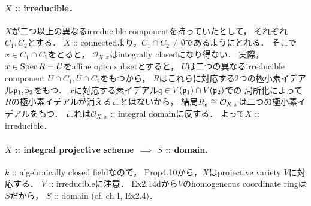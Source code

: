 \documentclass[a4paper]{jsarticle}
\newcommand{\shO}{\mathcal{O}}
\begin{document}
    \paragraph{$X$ :: irreducible．}
    $X$が二つ以上の異なるirreducible componentを持っていたとして，
    それぞれ$C_1, C_2$とする．
    $X$ :: connectedより，$C_1 \cap C_2 \neq \emptyset$であるようにとれる．
    そこで$x \in C_1 \cap C_2$をとると，
    $\shO_{X,x}$はintegrally closedになり得ない．
    実際，
    $x \in \operatorname{Spec} R=U$をaffine open subsetとすると，
    $U$は二つの異なるirreducible component $U \cap C_1, U \cap C_2$をもつから，
    $R$はこれらに対応する2つの極小素イデアル$\mathfrak{p}_1, \mathfrak{p}_2$をもつ．
    $x$に対応する素イデアル$\mathfrak{q} \in V(\mathfrak{p}_1) \cap V(\mathfrak{p}_2)$での
    局所化によって$R$の極小素イデアルが消えることはないから，
    結局$R_{\I{q}} \iso \shO_{X,x}$は二つの極小素イデアルをもつ．
    これは$\shO_{X,x}$ :: integral domainに反する．
    よって$X$ :: irreducible．

    \paragraph{$X$ :: integral projective scheme $\implies$ $S$ :: domain.}
    $k$ :: algebraically closed fieldなので，
    Prop4.10から，$X$はprojective variety $V$に対応する．
    $V$ :: irreducibleに注意．
    Ex2.14dから$V$のhomogeneous coordinate ringは$S$だから，
    $S$ :: domain (cf. ch I, Ex2.4)．
\end{document}
